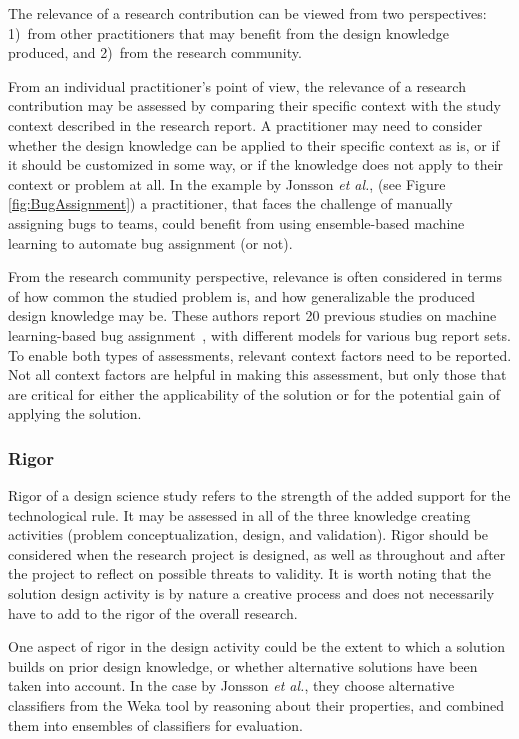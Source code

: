 \documentclass[graybox]{svmult}
\newcommand{\peggy}[1]{\textcolor{blue}{{\it [Peggy says: #1]}}}
\newcommand{\peggy}[1]{}
\begin{document}
The relevance of a research contribution can be viewed from two perspectives: 1)~from other practitioners that may benefit from the design knowledge produced, and 2)~from the research community. 

From an individual practitioner's point of view, the relevance of a research contribution may be assessed by comparing their specific context with the study context described in the research report. 
A practitioner may need to consider whether the design knowledge can be applied to their specific context as is, or if it should be customized in some way, or if the knowledge does not apply to their context or problem at all.
In the example by Jonsson \emph{et al.}, (see Figure \ref{fig:BugAssignment}) a practitioner, that faces the challenge of manually assigning bugs to teams, could benefit from using ensemble-based machine learning to automate bug assignment (or not). 

From the research community perspective, relevance is often considered in terms of how common the studied problem is, and how generalizable the produced design knowledge may be. These authors report 20 previous studies on machine learning-based bug assignment~\cite{JonssonBug15}, with different models for various bug report sets. To enable both types of assessments, relevant context factors need to be reported. Not all context factors are helpful in making this assessment, but only those that are critical for either the applicability of the solution or for the potential gain of applying the solution. 


\subsubsection{Rigor} 
Rigor of a design science study refers to the strength of the added support for the technological rule. It may be assessed in all of the three knowledge creating activities (problem conceptualization, design, and validation). 
Rigor should be considered when the research project is designed, as well as throughout and after the project to reflect on possible threats to validity. 
It is worth noting that the solution design activity is by nature a creative process and does not necessarily have to add to the rigor of the overall research. 

One aspect of rigor in the design activity could be the extent to which a solution builds on prior design knowledge, or whether alternative solutions have been taken into account. 
In the case by Jonsson \emph{et al.}, they choose alternative classifiers from the Weka tool by reasoning about their properties, and combined them into ensembles of classifiers for evaluation.
\end{document}
